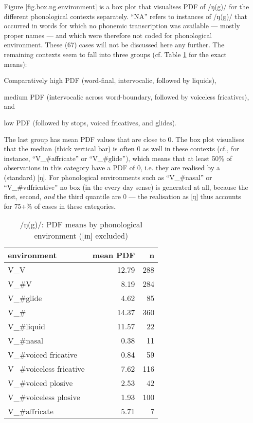 Figure \ref{fig.box.ng.environment} is a box plot that visualises PDF of /ŋ(g)/ for the different phonological contexts separately.
``NA'' refers to instances of /ŋ(g)/ that occurred in words for which no phonemic transcription was available --- mostly proper names --- and which were therefore not coded for phonological environment.
These (67) cases will not be discussed here any further.
The remaining contexts seem to fall into three groups (cf. Table \ref{tab.ng.mean.environment} for the exact means):
\begin{inparaenum}[(1)]
	\item Comparatively high PDF (word-final, intervocalic, followed by liquids),
	\item medium PDF (intervocalic across word-boundary, followed by voiceless fricatives), and
	\item low PDF (followed by stops, voiced fricatives, and glides).
\end{inparaenum}
The last group has mean PDF values that are close to 0.
The box plot visualises that the median (thick vertical bar) is often 0 as well in these contexts (cf., for instance, ``V\_\#affricate'' or ``V\_\#glide''), which means that at least 50\% of observations in this category have a PDF of 0, i.e. they are realised by a (standard) [ŋ].
For phonological environments such as ``V\_\#nasal'' or ``V\_\#vdfricative'' no box (in the every day sense) is generated at all, because the first, second, \emph{and} the third quantile are 0 --- the realisation as [ŋ] thus accounts for 75+\% of cases in these categories.

\begin{table}[h]
	\centering
	\caption{/ŋ(g)/: PDF means by phonological environment ([ɪn] excluded)}
	\label{tab.ng.mean.environment}
	\begin{tabular}{lrr}
		\hline
		environment & mean PDF & n\\
		\hline
		V\_V & 12.79 & 288\\
		V\_\#V & 8.19 & 284\\
		V\_\#glide & 4.62 & 85\\
		V\_\# & 14.37 & 360\\
		V\_\#liquid & 11.57 & 22\\
		V\_\#nasal & 0.38 & 11\\
		V\_\#voiced fricative & 0.84 & 59\\
		V\_\#voiceless fricative & 7.62 & 116\\
		V\_\#voiced plosive & 2.53 & 42\\
		V\_\#voiceless plosive & 1.93 & 100\\
		V\_\#affricate & 5.71 & 7\\
		\hline
	\end{tabular}
\end{table}

